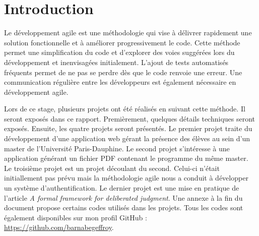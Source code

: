 \chapter*{Introduction}

Le développement agile est une méthodologie qui vise à délivrer rapidement une solution fonctionnelle et à améliorer progressivement le code. Cette méthode permet une simplification du code et d'explorer des voies suggérées lors du développement et inenvisagées initialement. L'ajout de tests automatisés fréquents permet de ne pas se perdre dès que le code renvoie une erreur. Une communication régulière entre les développeurs est également nécessaire en développement agile.

Lors de ce stage, plusieurs projets ont été réalisés en suivant cette méthode. Il seront exposés dans ce rapport. Premièrement, quelques détails techniques seront exposés. Ensuite, les quatre projets seront présentés. Le premier projet traite du développement d'une application web gérant la présence des élèves au sein d'un master de l'Université Paris-Dauphine. Le second projet s'intéresse à une application générant un fichier PDF contenant le programme du même master. Le troisième projet est un projet découlant du second. Celui-ci n'était initiallement pas prévu mais la méthodologie agile nous a conduit à développer un système d'authentification. Le dernier projet est une mise en pratique de l'article \textit{A formal framework for deliberated judgment}\cite{cailloux_formal_2020}. Une annexe à la fin du document propose certains codes utilisés dans les projets. Tous les codes sont également disponibles sur mon profil GitHub : \url{https://github.com/barnabegeffroy}.
